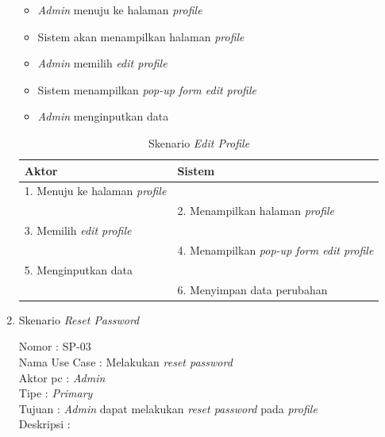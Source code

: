 \begin{enumerate}
\begin{itemize}
	\item \textit{Admin} menuju ke halaman \textit{profile}
	\item Sistem akan menampilkan halaman \textit{profile}
	\item \textit{Admin} memilih \textit{edit profile}
	\item Sistem menampilkan \textit{pop-up form edit profile}
	\item \textit{Admin} menginputkan data
	
\end{itemize}

\begin{table}
	\caption{Skenario \textit{Edit Profile}}
	\centering
	\begin{tabular}{ |  p{59mm} | l |}
		\hline 
		\textbf{Aktor} & \textbf{Sistem} \\
		\hline
		
		1.	Menuju ke halaman \textit{profile} &  \\
		
		\hline
		
		&  2.	Menampilkan halaman \textit{profile} \\
		
		\hline
		
		 3. Memilih \textit{edit profile} & \\
		
		\hline
		
			& 4.	Menampilkan\textit{ pop-up form edit profile} \\
		
		\hline
		
		5.	Menginputkan data  & \\
		\hline
		
		& 6.	Menyimpan data perubahan\\
		\hline
		
	\end{tabular}
\end{table}

\item Skenario \textit{Reset Password}

Nomor \kern 3.6pc : SP-03 \\
Nama Use Case : Melakukan \textit{reset password} \\
Aktor  pc : \textit{Admin} \\
Tipe \kern 4.6pc : \textit{Primary} \\
Tujuan \kern 3.6pc : \textit{Admin} dapat melakukan \textit{reset password} pada \textit{profile} \\
Deskripsi \kern 2.5pc : 


\end{enumerate}
